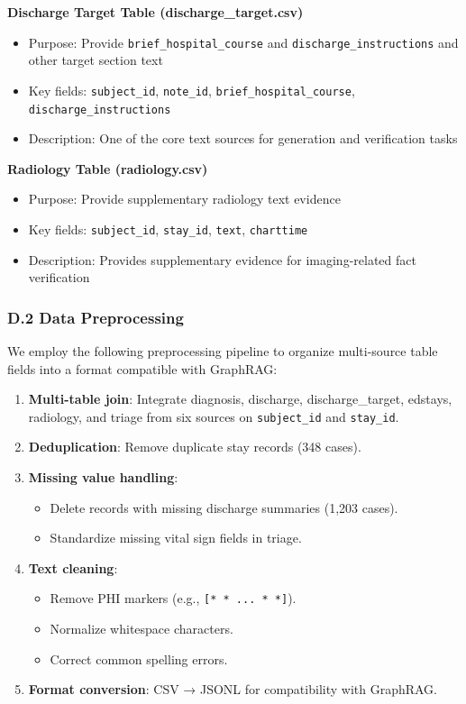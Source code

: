 \documentclass[11pt]{article}
\providecommand{\tightlist}{\setlength{\itemsep}{0pt}\setlength{\parskip}{0pt}}
\begin{document}
\textbf{Discharge Target Table (discharge\_target.csv)}

\begin{itemize}
\tightlist
\item
  Purpose: Provide \texttt{brief\_hospital\_course} and \texttt{discharge\_instructions} and other target section text
\item
  Key fields: \texttt{subject\_id}, \texttt{note\_id}, \texttt{brief\_hospital\_course}, \texttt{discharge\_instructions}
\item
  Description: One of the core text sources for generation and verification tasks
\end{itemize}

\textbf{Radiology Table (radiology.csv)}

\begin{itemize}
\tightlist
\item
  Purpose: Provide supplementary radiology text evidence
\item
  Key fields: \texttt{subject\_id}, \texttt{stay\_id}, \texttt{text}, \texttt{charttime}
\item
  Description: Provides supplementary evidence for imaging-related fact verification
\end{itemize}

\subsubsection{D.2 Data Preprocessing}

We employ the following preprocessing pipeline to organize multi-source table fields into a format compatible with GraphRAG:

\begin{enumerate}
\def\labelenumi{\arabic{enumi}.}
\tightlist
\item
  \textbf{Multi-table join}: Integrate diagnosis, discharge, discharge\_target, edstays, radiology, and triage from six sources on \texttt{subject\_id} and \texttt{stay\_id}.
\item
  \textbf{Deduplication}: Remove duplicate stay records (348 cases).
\item
  \textbf{Missing value handling}:

  \begin{itemize}
  \tightlist
  \item
    Delete records with missing discharge summaries (1,203 cases).
  \item
    Standardize missing vital sign fields in triage.
  \end{itemize}
\item
  \textbf{Text cleaning}:

  \begin{itemize}
  \tightlist
  \item
    Remove PHI markers (e.g., \texttt{{[}*\ *\ ...\ *\ *{]}}).
  \item
    Normalize whitespace characters.
  \item
    Correct common spelling errors.
  \end{itemize}
\item
  \textbf{Format conversion}: CSV → JSONL for compatibility with GraphRAG.
\end{enumerate}
\end{document}
